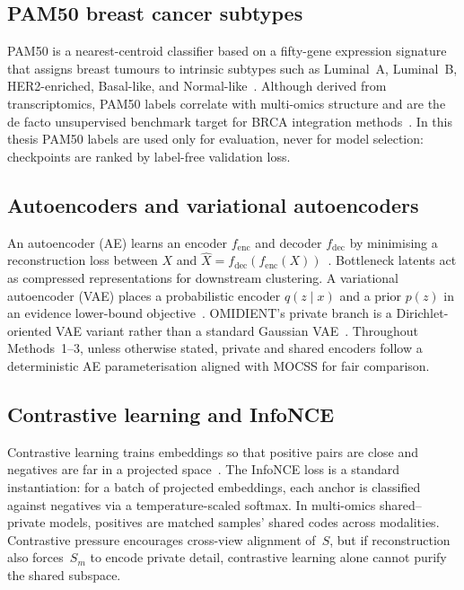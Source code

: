 \subsection{PAM50 breast cancer subtypes}

PAM50 is a nearest-centroid classifier based on a fifty-gene expression signature that assigns breast tumours to intrinsic subtypes such as Luminal~A, Luminal~B, HER2-enriched, Basal-like, and Normal-like~\citep{parker2009pam50}. Although derived from transcriptomics, PAM50 labels correlate with multi-omics structure and are the de facto unsupervised benchmark target for BRCA integration methods~\citep{chen2023mocss,rappoport2021evaluation}. In this thesis PAM50 labels are used only for evaluation, never for model selection: checkpoints are ranked by label-free validation loss.

\subsection{Autoencoders and variational autoencoders}

An autoencoder (AE) learns an encoder $f_{\mathrm{enc}}$ and decoder $f_{\mathrm{dec}}$ by minimising a reconstruction loss between $X$ and $\hat{X}=f_{\mathrm{dec}}(f_{\mathrm{enc}}(X))$~\citep{Goodfellow-et-al-2016}. Bottleneck latents act as compressed representations for downstream clustering. A variational autoencoder (VAE) places a probabilistic encoder $q(z\mid x)$ and a prior $p(z)$ in an evidence lower-bound objective~\citep{kingma2013auto}. OMIDIENT's private branch is a Dirichlet-oriented VAE variant rather than a standard Gaussian VAE~\citep{Safinianaini_Välimäki_Bresson_Gorbonos_Rajamäki_Aaltonen_Marttinen_2025}. Throughout Methods~1--3, unless otherwise stated, private and shared encoders follow a deterministic AE parameterisation aligned with MOCSS for fair comparison.

\subsection{Contrastive learning and InfoNCE}

Contrastive learning trains embeddings so that positive pairs are close and negatives are far in a projected space~\citep{chen2020simple}. The InfoNCE loss is a standard instantiation: for a batch of projected embeddings, each anchor is classified against negatives via a temperature-scaled softmax. In multi-omics shared--private models, positives are matched samples' shared codes across modalities. Contrastive pressure encourages cross-view alignment of~$S$, but if reconstruction also forces~$S_m$ to encode private detail, contrastive learning alone cannot purify the shared subspace.

